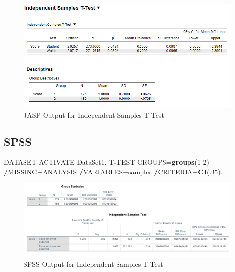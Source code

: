 \documentclass[
]{book}
\newenvironment{Shaded}{\begin{snugshade}}{\end{snugshade}}
\newcommand{\DecValTok}[1]{\textcolor[rgb]{0.00,0.00,0.81}{#1}}
\newcommand{\KeywordTok}[1]{\textcolor[rgb]{0.13,0.29,0.53}{\textbf{#1}}}
\newcommand{\NormalTok}[1]{#1}
\newcommand{\OperatorTok}[1]{\textcolor[rgb]{0.81,0.36,0.00}{\textbf{#1}}}
\begin{document}
\begin{figure}[!h]
\includegraphics{Screenshots/Independent Samples T test/isttJASP} \caption{\label{fig:isttJASP}JASP Output for Independent Samples T-Test}\label{fig:isttJASP}
\end{figure}

\hypertarget{spss}{%
\subsection{SPSS}\label{spss}}

\begin{Shaded}
\begin{Highlighting}[]
\NormalTok{DATASET ACTIVATE DataSet1.}
\NormalTok{T}\OperatorTok{-}\NormalTok{TEST GROUPS=}\KeywordTok{groups}\NormalTok{(}\DecValTok{1} \DecValTok{2}\NormalTok{)}
  \OperatorTok{/}\NormalTok{MISSING=ANALYSIS}
  \OperatorTok{/}\NormalTok{VARIABLES=samples}
  \OperatorTok{/}\NormalTok{CRITERIA=}\KeywordTok{CI}\NormalTok{(.}\DecValTok{95}\NormalTok{).}
\end{Highlighting}
\end{Shaded}

\begin{figure}[!h]
\includegraphics{Screenshots/Independent Samples T test/isttSPSS} \caption{\label{fig:isttSPSS}SPSS Output for Independent Samples T-Test}\label{fig:isttSPSS}
\end{figure}
\end{document}
